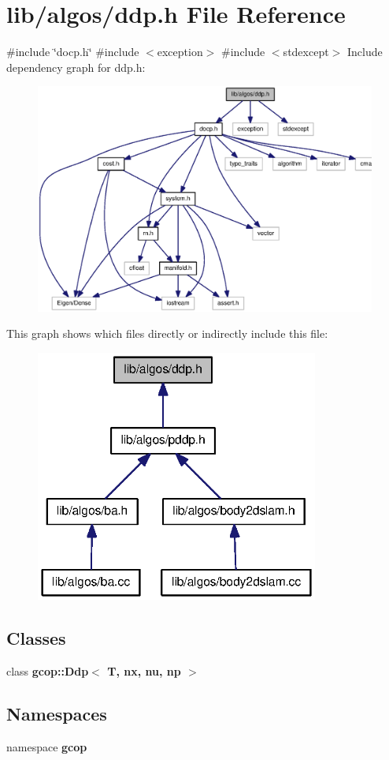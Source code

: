 \section{lib/algos/ddp.h \-File \-Reference}
\label{ddp_8h}
{\ttfamily \#include \char`\"{}docp.\-h\char`\"{}}\*
{\ttfamily \#include $<$exception$>$}\*
{\ttfamily \#include $<$stdexcept$>$}\*
\-Include dependency graph for ddp.\-h\-:\nopagebreak
\begin{figure}[H]
\begin{center}
\leavevmode
\includegraphics[width=350pt]{ddp_8h__incl}
\end{center}
\end{figure}
\-This graph shows which files directly or indirectly include this file\-:\nopagebreak
\begin{figure}[H]
\begin{center}
\leavevmode
\includegraphics[width=264pt]{ddp_8h__dep__incl}
\end{center}
\end{figure}
\subsection*{\-Classes}
\begin{DoxyCompactItemize}
\item 
class {\bf gcop\-::\-Ddp$<$ T, nx, nu, np $>$}
\end{DoxyCompactItemize}
\subsection*{\-Namespaces}
\begin{DoxyCompactItemize}
\item 
namespace {\bf gcop}
\end{DoxyCompactItemize}
